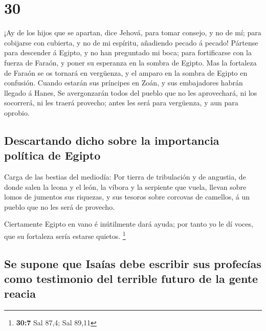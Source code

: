 \hypertarget{section-29}{%
\section{30}\label{section-29}}

 ¡Ay de los hijos que se apartan, dice Jehová, para tomar
consejo, y no de mí; para cobijarse con cubierta, y no de mi espíritu,
añadiendo pecado á pecado!  Pártense para descender á
Egipto, y no han preguntado mi boca; para fortificarse con la fuerza de
Faraón, y poner su esperanza en la sombra de Egipto.  Mas
la fortaleza de Faraón se os tornará en vergüenza, y el amparo en la
sombra de Egipto en confusión.  Cuando estarán sus
príncipes en Zoán, y sus embajadores habrán llegado á Hanes,
 Se avergonzarán todos del pueblo que no les aprovechará,
ni los socorrerá, ni les traerá provecho; antes les será para vergüenza,
y aun para oprobio.

\hypertarget{descartando-dicho-sobre-la-importancia-poluxedtica-de-egipto}{%
\subsection{Descartando dicho sobre la importancia política de
Egipto}\label{descartando-dicho-sobre-la-importancia-poluxedtica-de-egipto}}

 Carga de las bestias del mediodía: Por tierra de
tribulación y de angustia, de donde salen la leona y el león, la víbora
y la serpiente que vuela, llevan sobre lomos de jumentos sus riquezas, y
sus tesoros sobre corcovas de camellos, á un pueblo que no les será de
provecho.

 Ciertamente Egipto en vano é inútilmente dará ayuda; por
tanto yo le dí voces, que su fortaleza sería estarse quietos.
\footnote{\textbf{30:7} Sal 87,4; Sal 89,11}

\hypertarget{se-supone-que-isauxedas-debe-escribir-sus-profecuxedas-como-testimonio-del-terrible-futuro-de-la-gente-reacia}{%
\subsection{Se supone que Isaías debe escribir sus profecías como
testimonio del terrible futuro de la gente
reacia}\label{se-supone-que-isauxedas-debe-escribir-sus-profecuxedas-como-testimonio-del-terrible-futuro-de-la-gente-reacia}}

